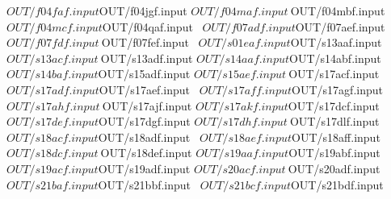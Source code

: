 \documentclass{article}
\begin{document}
       ${OUT}/f04faf.input   ${OUT}/f04jgf.input     ${OUT}/f04maf.input \
       ${OUT}/f04mbf.input   ${OUT}/f04mcf.input     ${OUT}/f04qaf.input \
       ${OUT}/f07adf.input   ${OUT}/f07aef.input     ${OUT}/f07fdf.input \
       ${OUT}/f07fef.input   \
       ${OUT}/s01eaf.input   ${OUT}/s13aaf.input     ${OUT}/s13acf.input \
       ${OUT}/s13adf.input   ${OUT}/s14aaf.input     ${OUT}/s14abf.input \
       ${OUT}/s14baf.input   ${OUT}/s15adf.input     ${OUT}/s15aef.input \
       ${OUT}/s17acf.input   ${OUT}/s17adf.input     ${OUT}/s17aef.input \
       ${OUT}/s17aff.input   ${OUT}/s17agf.input     ${OUT}/s17ahf.input \
       ${OUT}/s17ajf.input   ${OUT}/s17akf.input     ${OUT}/s17dcf.input \
       ${OUT}/s17def.input   ${OUT}/s17dgf.input     ${OUT}/s17dhf.input \
       ${OUT}/s17dlf.input   ${OUT}/s18acf.input     ${OUT}/s18adf.input \
       ${OUT}/s18aef.input   ${OUT}/s18aff.input     ${OUT}/s18dcf.input \
       ${OUT}/s18def.input   ${OUT}/s19aaf.input     ${OUT}/s19abf.input \
       ${OUT}/s19acf.input   ${OUT}/s19adf.input     ${OUT}/s20acf.input \
       ${OUT}/s20adf.input   ${OUT}/s21baf.input     ${OUT}/s21bbf.input \
       ${OUT}/s21bcf.input   ${OUT}/s21bdf.input
\end{document}
